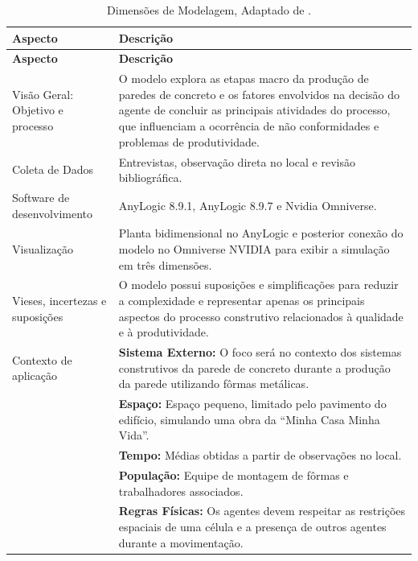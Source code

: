 \begin{longtable}{@{} p{} p{} @{}}
	\caption{Dimensões de Modelagem, Adaptado de .}
	\label{tab:protocolo_abm} \\
	
	\toprule
	\textbf{Aspecto} & \textbf{Descrição} \\
	\midrule
	\endfirsthead
	
	\toprule
	\textbf{Aspecto} & \textbf{Descrição} \\
	\midrule
	\endhead
	
	Visão Geral: Objetivo e processo & O modelo explora as etapas macro da produção de paredes de concreto e os fatores envolvidos na decisão do agente de concluir as principais atividades do processo, que influenciam a ocorrência de não conformidades e problemas de produtividade. \\
	\midrule
	
	Coleta de Dados & Entrevistas, observação direta no local e revisão bibliográfica. \\
	\midrule
	
	Software de desenvolvimento & AnyLogic 8.9.1, AnyLogic 8.9.7 e Nvidia Omniverse. \\
	\midrule
	
	Visualização & Planta bidimensional no AnyLogic e posterior conexão do modelo no Omniverse NVIDIA para exibir a simulação em três dimensões. \\
	\midrule
	
	Vieses, incertezas e suposições & O modelo possui suposições e simplificações para reduzir a complexidade e representar apenas os principais aspectos do processo construtivo relacionados à qualidade e à produtividade. \\
	\midrule
	
	Contexto de aplicação & \textbf{Sistema Externo:} O foco será no contexto dos sistemas construtivos da parede de concreto durante a produção da parede utilizando fôrmas metálicas. \\
	& \textbf{Espaço:} Espaço pequeno, limitado pelo pavimento do edifício, simulando uma obra da “Minha Casa Minha Vida”. \\
	& \textbf{Tempo:} Médias obtidas a partir de observações no local. \\
	& \textbf{População:} Equipe de montagem de fôrmas e trabalhadores associados. \\
	& \textbf{Regras Físicas:} Os agentes devem respeitar as restrições espaciais de uma célula e a presença de outros agentes durante a movimentação. \\
	\midrule
	

\end{longtable}
